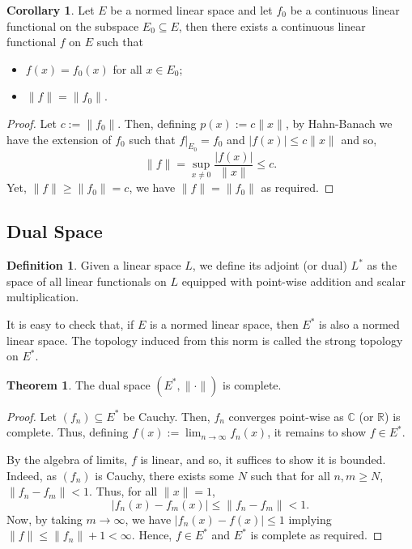 \documentclass[]{article}
\theoremstyle{definition}
\newtheorem{theorem}{Theorem}
\newtheorem{corollary}{Corollary}[theorem]
\theoremstyle{definition}
\newtheorem{definition}{Definition}[section]
\begin{document}
\begin{corollary}
  Let \(E\) be a normed linear space and let \(f_0\) be a continuous linear 
  functional on the subspace \(E_0 \subseteq E\), then there exists a 
  continuous linear functional \(f\) on \(E\) such that 
  \begin{itemize}
    \item \(f(x) = f_0(x)\) for all \(x \in E_0\);
    \item \(\|f\| = \|f_0\|\).
  \end{itemize}
\end{corollary}
\begin{proof}
  Let \(c := \|f_0\|\). Then, defining \(p(x) := c\|x\|\), by Hahn-Banach 
  we have the extension of \(f_0\) such that \(f|_{E_0} = f_0\) and 
  \(|f(x)| \le c\|x\|\) and so, 
  \[\|f\| = \sup_{x \neq 0} \frac{|f(x)|}{\|x\|} \le c.\]
  Yet, \(\|f\| \ge \|f_0\| = c\), we have \(\|f\| = \|f_0\|\) as required.
\end{proof}

\subsection{Dual Space}

\begin{definition}
  Given a linear space \(L\), we define its adjoint (or dual) \(L^*\) as the space 
  of all linear functionals on \(L\) equipped with point-wise addition and 
  scalar multiplication. 
\end{definition}

It is easy to check that, if \(E\) is a normed linear space, then \(E^*\) is 
also a normed linear space. The topology induced from this norm is called the strong 
topology on \(E^*\).

\begin{theorem}
  The dual space \((E^*, \|\cdot\|)\) is complete.
\end{theorem}
\begin{proof}
  Let \((f_n) \subseteq E^*\) be Cauchy. Then, \(f_n\) converges point-wise as 
  \(\mathbb{C}\) (or \(\mathbb{R}\)) is complete. Thus, defining 
  \(f(x) := \lim_{n \to \infty} f_n(x)\), it remains to show \(f \in E^*\).

  By the algebra of limits, \(f\) is linear, and so, it suffices to show it is 
  bounded. Indeed, as \((f_n)\) is Cauchy, there exists some \(N\) such that 
  for all \(n, m \ge N\), \(\|f_n - f_m\| < 1\). Thus, for all \(\|x\| = 1\), 
  \[|f_n(x) - f_m(x)| \le \|f_n - f_m\| < 1.\]
  Now, by taking \(m \to \infty\), we have \(|f_n(x) - f(x)| \le 1\) implying 
  \(\|f\| \le \|f_n\| + 1 < \infty\). Hence, \(f \in E^*\) and \(E^*\) is complete 
  as required.
\end{proof}
\end{document}
